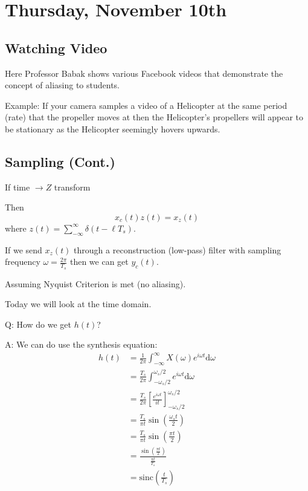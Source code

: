 \section{Thursday, November 10th}
\subsection{Watching Video}
Here Professor Babak shows various Facebook videos that demonstrate the concept of aliasing to students.

Example: If your camera samples a video of a Helicopter at the same period (rate) that the propeller moves at then the Helicopter's propellers will appear to be stationary as the Helicopter seemingly hovers upwards.

\subsection{Sampling (Cont.)}
If time $\to Z$ transform

Then 
\[
    x_c(t) z(t) = x_z(t)
\]
where $z(t)=\sum_{-\infty}^\infty \delta(t-\ell T_s)$.

If we send $x_z(t)$ through a reconstruction (low-pass) filter with sampling frequency $\omega=\frac{2\pi}{T_s}$ then we can get $y_c(t)$.

Assuming Nyquist Criterion is met (no aliasing).

Today we will look at the time domain.
\begin{shaded}
Q: How do we get $h(t)$?
\end{shaded}
A: We can do use the synthesis equation:
\begin{align*}
    h(t)
    &=\frac1{2\pi}\int_{-\infty}^\infty X(\omega) e^{i\omega t} \mathrm d \omega
    \\
    &=\frac{T_s}{2\pi}\int_{-\omega_s/2}^{\omega_s/2} e^{i\omega t} \mathrm d \omega
    \\
    &=\frac{T_s}{2\pi}
    \left[
    \frac{e^{i\omega t}}{it}
    \right]_{-\omega_s/2}^{\omega_s/2}
    \\
    &=\frac{T_s}{\pi t}
    \sin\left(\frac{\omega_s t}{2}\right)
    \\
    &=\frac{T_s}{\pi t}
    \sin\left(\frac{\pi t}{2}\right)
    \\
    &=\frac{\sin\left(\frac{\pi t}{2}\right)}{\frac{\pi t}{T_s}}
    \\
    &=\text{sinc}\left(\frac t{T_s}\right)
\end{align*}


